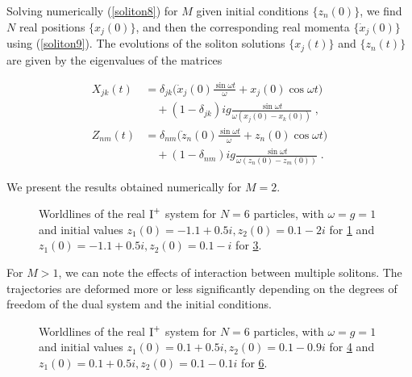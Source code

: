 Solving numerically (\ref{soliton8}) for $M$ given initial conditions $\{z_n(0)\}$, we find $N$ real positions $\{x_j(0)\}$, and then the corresponding real momenta $\{\dot x_j(0)\}$ using (\ref{soliton9}). The evolutions of the soliton solutions $\{x_j(t)\}$ and $\{z_n(t)\}$ are given by the eigenvalues of the matrices

\begin{subequations}
\begin{align}
    X_{jk} (t) &= \delta_{jk} \Big (\dot x_j(0)\frac{\sin{\omega t}}{\omega} + x_j (0)\cos{\omega t} \Big ) \nonumber\\ &\quad + (1 - \delta_{jk}) ig \frac{\sin{\omega t}}{\omega(x_j(0) - x_k(0))}\;, \\
    Z_{nm} (t) &= \delta_{nm} \Big (\dot z_n(0)\frac{\sin{\omega t}}{\omega} + z_n (0)\cos{\omega t} \Big ) \nonumber\\ &\quad + (1 - \delta_{nm}) ig \frac{\sin{\omega t}}{\omega(z_n(0) - z_m(0))}\;.
\end{align}
\end{subequations}

We present the results obtained numerically for $M = 2$. 

\begin{figure}[H]
\centering
\begin{subfigure}{.49\textwidth}
  \centering
  \caption{}
  \label{2soliton61}
\end{subfigure}%
\begin{subfigure}{.49\textwidth}
  \centering
  \caption{}
  \label{2soliton62}
\end{subfigure}
\caption{Worldlines of the real $\textnormal{I}^+$ system for $N = 6$ particles, with $\omega = g = 1$ and initial values $z_1(0) = -1.1 + 0.5i, z_2(0) = 0.1 -2i$ for \ref{2soliton61} and $z_1(0) = -1.1 + 0.5i, z_2(0) = 0.1 - i$ for \ref{2soliton62}.}
\end{figure}

For $M > 1$, we can note the effects of interaction between multiple solitons. The trajectories are deformed more or less significantly depending on the degrees of freedom of the dual system and the initial conditions.  

\begin{figure}[H]
\centering
\begin{subfigure}{.49\textwidth}
  \centering
  \caption{}
  \label{2soliton63}
\end{subfigure}%
\begin{subfigure}{.49\textwidth}
  \centering
  \caption{}
  \label{2soliton64}
\end{subfigure}
\caption{Worldlines of the real $\textnormal{I}^+$ system for $N = 6$ particles, with $\omega = g = 1$ and initial values $z_1(0) = 0.1 + 0.5i, z_2(0) = 0.1 -0.9i$ for \ref{2soliton63} and $z_1(0) = 0.1 + 0.5i, z_2(0) = 0.1 - 0.1i$ for \ref{2soliton64}.}
\end{figure}

